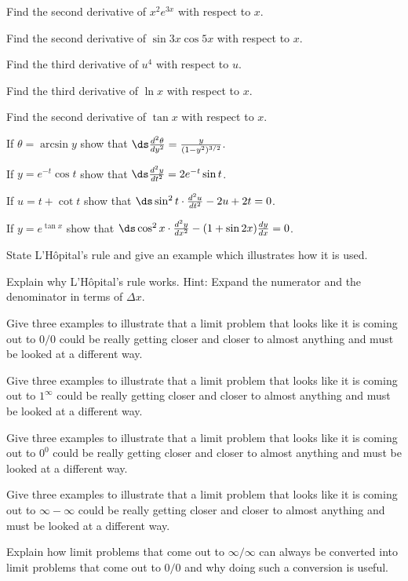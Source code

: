 \begin{multicols}{2}
  \problem Find the second derivative of $x^2e^{3x}$ with respect to $x$.


  \problem Find the second derivative of $\sin 3x\cos 5x$ with respect to
  $x$.


  \problem Find the third derivative of $u^4$ with respect to $u$.


  \problem Find the third derivative of $\ln x$ with respect to $x$.


  \problem Find the second derivative of $\tan x$ with respect to $x$.


  \problem If $\theta=\arcsin y$ show that $\ds\frac{d^2 \theta}{ dy^2} =
  \frac{y}{ (1-y^2)^{3/2} } $.


  \problem If $y=e^{-t}\cos t$ show that $\ds\frac{d^2 y}{ dt^2} =
  2e^{-t}\sin t$.


  \problem If $u=t+\cot t$ show that $\ds \sin^2 t\cdot \frac{d^2 u}{
  dt^2}-2u+2t=0 $.


  \problem If $y=e^{\tan x}$ show that $\ds \cos^2 x\cdot\frac{d^2 y}{
  dx^2}-(1+\sin 2x)\frac{dy}{dx}=0 $.


  \problem State L'H\^opital's rule and give an example which illustrates how
  it is used.


  \problem Explain why L'H\^opital's rule works.  Hint: Expand the numerator
  and the denominator in terms of $\Delta x$.


  \problem Give three examples to illustrate that a limit problem that looks
  like it is coming out to $0/0$ could be really getting closer and closer to
  almost anything and must be looked at a different way.


  \problem Give three examples to illustrate that a limit problem that looks
  like it is coming out to $1^\infty$ could be really getting closer and
  closer to almost anything and must be looked at a different way.


  \problem Give three examples to illustrate that a limit problem that looks
  like it is coming out to $0^0$ could be really getting closer and closer to
  almost anything and must be looked at a different way.


  \problem Give three examples to illustrate that a limit problem that looks
  like it is coming out to $\infty-\infty$ could be really getting closer and
  closer to almost anything and must be looked at a different way.


  \problem Explain how limit problems that come out to $\infty/\infty$ can
  always be converted into limit problems that come out to $0/0$ and why
  doing such a conversion is useful.



\end{multicols}
